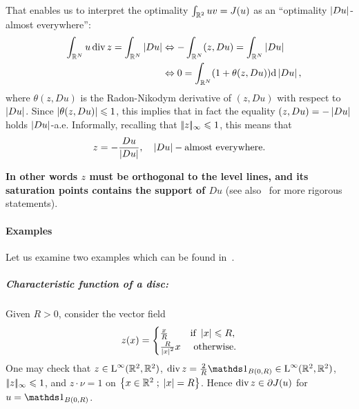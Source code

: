 \begin{rem}
  That  enables us to interpret the optimality $\int_{\mathbb{R}^2} uv = J(u)$ as an ``optimality $\left| Du \right|$-almost everywhere'': 
\begin{align*}
  \label{eq:}
  \quad \int_{\mathbb{R}^N} u\operatorname{div} z = \int_{\mathbb{R}^N} \left| Du \right| 
  &\Leftrightarrow   -\int_{\mathbb{R}^N} (z,Du) = \int_{\mathbb{R}^N} \left| Du \right| \\
  &\Leftrightarrow  0 = \int_{\mathbb{R}^N} (1+\theta(z,Du))\mathrm{d} \left| Du \right|,
\end{align*}
where $\theta(z,Du)$ is the Radon-Nikodym derivative of $(z,Du)$ with respect to $\left| Du \right|$.
Since $\left| \theta(z,Du) \right|\leqslant 1$, this implies that in fact the equality $(z,Du)=-\left| Du \right|$ holds $\left| Du \right|$-a.e.
Informally, recalling that $|\!| z |\!|_{\infty}\leqslant 1$, this means that
\begin{equation*}
  z= -\frac{Du}{\left| Du \right|}, \quad \left| Du \right|-\mbox{almost everywhere.}
\end{equation*}

\textbf{In other words $z$ must be orthogonal to the level lines, and its saturation points contains the support of $Du$} (see also~\cite{bredies2012,ChaGolNov12a} for more rigorous statements).
\end{rem} %

\paragraph{Examples}
Let us examine two examples which can be found in~\cite{Meyer}.

\subparagraph{Characteristic function of a disc:}
Given $R>0$, consider the vector field 
\begin{equation}\label{eq-calib-disc}
  z(x)=\begin{cases}
    \frac{x}{R} & \text{if } \left| x \right|\leqslant R, \\
    \frac{R}{\left| x \right|^2}x & \text{ otherwise.}
  \end{cases}
\end{equation}
One may check that $z\in \text{\upshape L}^\infty(\mathbb{R}^2,\mathbb{R}^2)$, $\divx z= \frac{2}{R}\bun{B(0,R)}\in \Linf(\RR^2,\RR^2)$, $|\!| z |\!|_{\infty}\leqslant 1$, and $z\cdot \nu =1$ on $\left\{ x\in\mathbb{R}^2 \;;\; \left| x \right|=R \right\}$. Hence  $\operatorname{div} z\in \partial J(u)$ for $u=\bun{B(0,R)}$.


